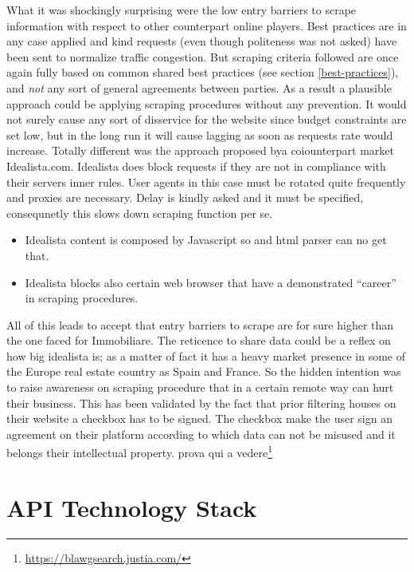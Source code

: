 \documentclass[
  12pt,
  a4paper,
  oneside]{book}
\DeclareRobustCommand{\href}[2]{#2\footnote{\url{#1}}}
\providecommand{\tightlist}{%
  \setlength{\itemsep}{0pt}\setlength{\parskip}{0pt}}
\theoremstyle{definition}
\theoremstyle{definition}
\theoremstyle{definition}
\theoremstyle{remark}
\begin{document}
What it was shockingly surprising were the low entry barriers to scrape information with respect to other counterpart online players. Best practices are in any case applied and kind requests (even though politeness was not asked) have been sent to normalize traffic congestion. But scraping criteria followed are once again fully based on common shared best practices (see section \ref{best-practices}), and \emph{not} any sort of general agreements between parties. As a result a plausible approach could be applying scraping procedures without any prevention. It would not surely cause any sort of disservice for the website since budget constraints are set low, but in the long run it will cause lagging as soon as requests rate would increase. Totally different was the approach proposed bya coiounterpart market Idealista.com. Idealista does block requests if they are not in compliance with their servers inner rules. User agents in this case must be rotated quite frequently and proxies are necessary. Delay is kindly asked and it must be specified, consequnetly this slows down scraping function per se.

\begin{itemize}
\tightlist
\item
  Idealista content is composed by Javascript so and html parser can no get that.
\item
  Idealista blocks also certain web browser that have a demonstrated ``career'' in scraping procedures.
\end{itemize}

All of this leads to accept that entry barriers to scrape are for sure higher than the one faced for Immobiliare. The reticence to share data could be a reflex on how big idealista is; as a matter of fact it has a heavy market presence in some of the Europe real estate country as Spain and France. So the hidden intention was to raise awareness on scraping procedure that in a certain remote way can hurt their business. This has been validated by the fact that prior filtering houses on their website a checkbox has to be signed. The checkbox make the user sign an agreement on their platform according to which data can not be misused and it belongs their intellectual property.
\href{https://blawgsearch.justia.com/}{prova qui a vedere}

\hypertarget{Infrastructure}{%
\chapter{API Technology Stack}\label{Infrastructure}}
\end{document}
